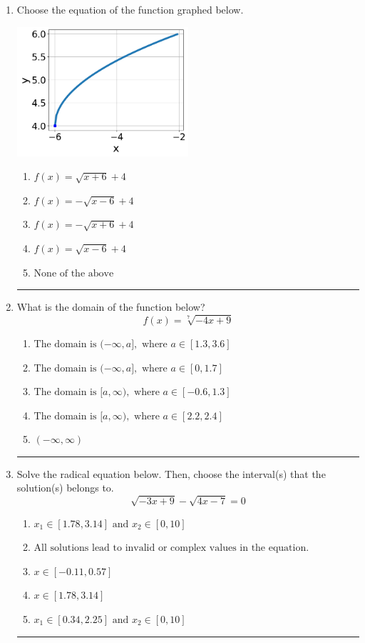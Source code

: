 \documentclass[14pt]{extbook}
\newcommand{\litem}[1]{\item#1\hspace*{-1cm}\rule{\textwidth}{0.4pt}}
\begin{document}
\begin{enumerate}
{\begin{enumerate}[label=\Alph*.]
\end{enumerate} }
\litem{
Choose the equation of the function graphed below.
\begin{center}
    \includegraphics[width=0.5\textwidth]{../Figures/radicalGraphToEquationB.png}
\end{center}
\begin{enumerate}[label=\Alph*.]
\item \( f(x) = \sqrt{x + 6} + 4 \)
\item \( f(x) = - \sqrt{x - 6} + 4 \)
\item \( f(x) = - \sqrt{x + 6} + 4 \)
\item \( f(x) = \sqrt{x - 6} + 4 \)
\item \( \text{None of the above} \)

\end{enumerate} }
\litem{
What is the domain of the function below?\[ f(x) = \sqrt[7]{-4 x + 9} \]\begin{enumerate}[label=\Alph*.]
\item \( \text{The domain is } (-\infty, a], \text{   where } a \in [1.3, 3.6] \)
\item \( \text{The domain is } (-\infty, a], \text{   where } a \in [0, 1.7] \)
\item \( \text{The domain is } [a, \infty), \text{   where } a \in [-0.6, 1.3] \)
\item \( \text{The domain is } [a, \infty), \text{   where } a \in [2.2, 2.4] \)
\item \( (-\infty, \infty) \)

\end{enumerate} }
\litem{
Solve the radical equation below. Then, choose the interval(s) that the solution(s) belongs to.\[ \sqrt{-3 x + 9} - \sqrt{4 x - 7} = 0 \]\begin{enumerate}[label=\Alph*.]
\item \( x_1 \in [1.78, 3.14] \text{ and } x_2 \in [0,10] \)
\item \( \text{All solutions lead to invalid or complex values in the equation.} \)
\item \( x \in [-0.11,0.57] \)
\item \( x \in [1.78,3.14] \)
\item \( x_1 \in [0.34, 2.25] \text{ and } x_2 \in [0,10] \)


\end{enumerate}}
\end{enumerate}
\end{document}
